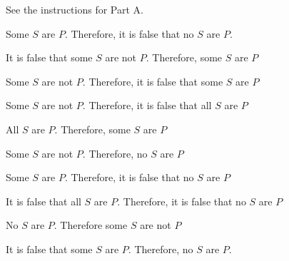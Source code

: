 \problempart See the instructions for Part A.
\begin{exercises}
\item Some $S$ are $P$. Therefore, it is false that no $S$ are $P$. 
\item It is false that some $S$ are not $P$. Therefore, some $S$ are $P$		
\item Some $S$ are not $P$. Therefore, it is false that some $S$ are $P$   
\item Some $S$ are not $P$. Therefore, it is false that all $S$ are $P$	
\item All $S$ are $P$. Therefore, some $S$ are $P$    
\item Some $S$ are not $P$. Therefore, no $S$ are $P$		
\item Some $S$ are $P$. Therefore, it is false that no $S$ are $P$ 
\item It is false that all $S$ are $P$. Therefore, it is false that no $S$ are $P$  
\item No $S$ are $P$. Therefore some $S$ are not $P$    
\item It is false that some $S$ are $P$. Therefore, no $S$ are $P$.			
\end{exercises}


